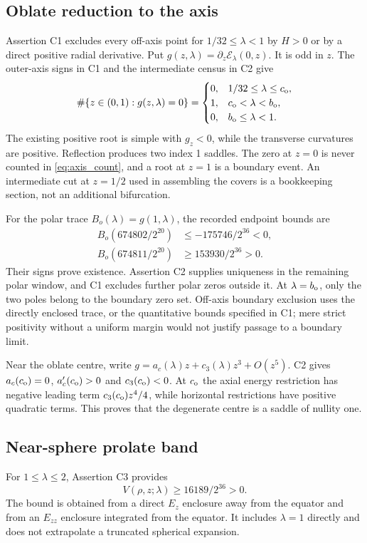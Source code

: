 \subsection{Oblate reduction to the axis}
Assertion C1 excludes every off-axis point for $1/32\le\lambda<1$ by $H>0$ or by a direct positive radial derivative. Put $g(z,\lambda)=\partial_z\mathcal E_\lambda(0,z)$. It is odd in $z$. The outer-axis signs in C1 and the intermediate census in C2 give
\begin{equation}\label{eq:axis_count}
 \#\{z\in(0,1):g(z,\lambda)=0\}
 =\begin{cases}
 0,&1/32\le\lambda\le c_{\mathrm o},\\
 1,&c_{\mathrm o}<\lambda<b_{\mathrm o},\\
 0,&b_{\mathrm o}\le\lambda<1.
 \end{cases}
\end{equation}
The existing positive root is simple with $g_z<0$, while the transverse curvatures are positive. Reflection produces two index 1 saddles. The zero at $z=0$ is never counted in \eqref{eq:axis_count}, and a root at $z=1$ is a boundary event. An intermediate cut at $z=1/2$ used in assembling the covers is a bookkeeping section, not an additional bifurcation.

For the polar trace $B_o(\lambda)=g(1,\lambda)$, the recorded endpoint bounds are
\begin{align}\label{eq:oblate_endpoint}
 B_o(674802/2^{20})&\le-175746/2^{36}<0,\\
 B_o(674811/2^{20})&\ge153930/2^{36}>0.\nonumber
\end{align}
Their signs prove existence. Assertion C2 supplies uniqueness in the remaining polar window, and C1 excludes further polar zeros outside it. At $\lambda=b_{\mathrm o}$, only the two poles belong to the boundary zero set. Off-axis boundary exclusion uses the directly enclosed trace, or the quantitative bounds specified in C1; mere strict positivity without a uniform margin would not justify passage to a boundary limit.

Near the oblate centre, write $g=a_c(\lambda)z+c_3(\lambda)z^3+O(z^5)$. C2 gives $a_c(c_{\mathrm o})=0$, $a_c'(c_{\mathrm o})>0$ and $c_3(c_{\mathrm o})<0$. At $c_{\mathrm o}$ the axial energy restriction has negative leading term $c_3(c_{\mathrm o})z^4/4$, while horizontal restrictions have positive quadratic terms. This proves that the degenerate centre is a saddle of nullity one.

\subsection{Near-sphere prolate band}
For $1\le\lambda\le2$, Assertion C3 provides
\begin{equation}\label{eq:near_V}
 V(\rho,z;\lambda)\ge16189/2^{36}>0.
\end{equation}
The bound is obtained from a direct $E_z$ enclosure away from the equator and from an $E_{zz}$ enclosure integrated from the equator. It includes $\lambda=1$ directly and does not extrapolate a truncated spherical expansion.

